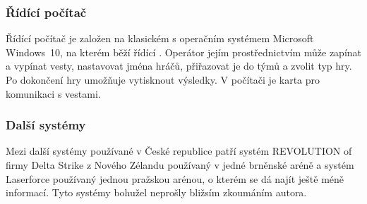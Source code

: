 \subsubsection{Řídící počítač}
Řídící počítač je založen na klasickém  s operačním systémem Microsoft Windows~10, na kterém běží řídící . Operátor jejím prostřednictvím může zapínat a vypínat vesty, nastavovat jména hráčů, přiřazovat je do týmů a zvolit typ hry. Po dokončení hry umožňuje  vytisknout výsledky. V počítači je  karta pro komunikaci s vestami.


\subsubsection{Další systémy}
Mezi další systémy používané v České republice patří systém REVOLUTION of firmy Delta Strike z Nového Zélandu používaný v jedné brněnské aréně a systém Laserforce používaný jednou pražskou arénou, o kterém se dá najít ještě méně informací. Tyto systémy bohužel neprošly bližsím zkoumáním autora.
